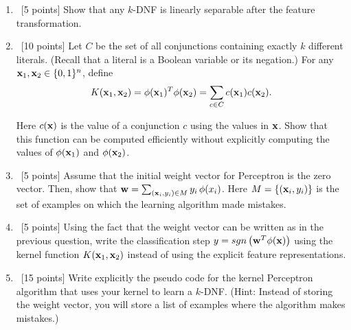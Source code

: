 \begin{enumerate}
\item ~[5 points] Show that any $k$-DNF is linearly separable after
  the feature transformation.


\item ~[10 points] Let $C$ be the set of all conjunctions containing
  exactly $k$ different literals. (Recall that a literal is a Boolean
  variable or its negation.) For any ${\bf x}_1, {\bf x}_2 \in \{0, 1\}^n$,
  define
  $$K({\bf x}_1, {\bf x}_2) = \phi({\bf x}_1)^T\phi({\bf x}_2) = \sum_{c \in C} c({\bf x}_1)c({\bf x}_2).$$ 

  Here $c({\bf x})$ is the value of a conjunction $c$ using the values in
  ${\bf x}$. Show that this function can be computed efficiently without
  explicitly computing the values of $\phi({\bf x}_1)$ and $\phi({\bf x}_2)$.

\item ~[5 points] Assume that the initial weight vector for Perceptron
  is the zero vector. Then, show that
  ${\bf w} = \sum_{({\bf x}_i, y_i) \in M} y_i \, \phi(x_i)$. Here
  $M = \{({\bf x}_i, y_i)\}$ is the set of examples on which the learning
  algorithm made mistakes.

\item ~[5 points] Using the fact that the weight vector can be written
  as in the previous question, write the classification step
  $y=sgn\left({\bf w}^T\phi({\bf x})\right)$ using the kernel function
  $K({\bf x}_1,{\bf x}_2)$ instead of using the explicit feature
  representations.

\item ~[15 points] Write explicitly the pseudo code for the kernel
  Perceptron algorithm that uses your kernel to learn a $k$-DNF.
  (Hint: Instead of storing the weight vector, you will store a list
  of examples where the algorithm makes mistakes.)
\end{enumerate}


